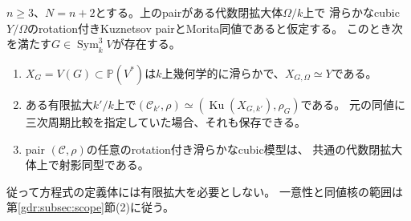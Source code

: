 \begin{theorem}[可換cubic模型の方程式は基礎体上に取れる]
\label{gcd:thm:field-model}
$n\ge3$、$N=n+2$とする。上のpairがある代数閉拡大体$\Omega/k$上で
滑らかなcubic $Y/\Omega$のrotation付きKuznetsov pairとMorita同値であると仮定する。
このとき次を満たす$G\in\operatorname{Sym}^3_k V$が存在する。
\begin{enumerate}
\item $X_G=V(G)\subset\mathbb P(V^*)$は$k$上幾何学的に滑らかで、$X_{G,\Omega}\simeq Y$である。
\item ある有限拡大$k'/k$上で$(\mathcal C_{k'},\rho)\simeq(\operatorname{Ku}(X_{G,k'}),\rho_G)$である。
元の同値に三次周期比較を指定していた場合、それも保存できる。
\item pair $(\mathcal C,\rho)$の任意のrotation付き滑らかなcubic模型は、
共通の代数閉拡大体上で射影同型である。
\end{enumerate}
従って方程式の定義体には有限拡大を必要としない。
一意性と同値核の範囲は第\ref{gdr:subsec:scope}節(2)に従う。
\end{theorem}
